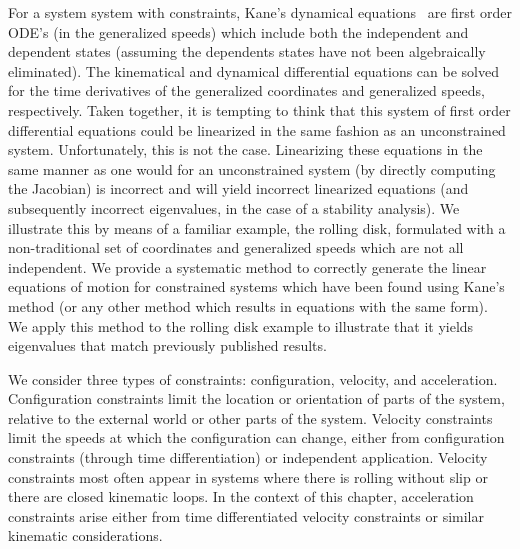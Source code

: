 For a system system with constraints, Kane's dynamical equations~\cite{Kane1985}
are first order ODE's (in the generalized speeds) which include both the
independent and dependent states (assuming the dependents states have not been
algebraically eliminated). The kinematical and dynamical differential equations
can be solved for the time derivatives of the generalized coordinates and
generalized speeds, respectively. Taken together, it is tempting to think that
this system of first order differential equations could be linearized in the
same fashion as an unconstrained system.  Unfortunately, this is not the case.
Linearizing these equations in the same manner as one would for an
unconstrained system (by directly computing the Jacobian) is incorrect and will
yield incorrect linearized equations (and subsequently incorrect eigenvalues,
in the case of a stability analysis). We illustrate this by means of a familiar
example, the rolling disk, formulated with a non-traditional set of coordinates
and generalized speeds which are not all independent. We provide a systematic
method to correctly generate the linear equations of motion for constrained
systems which have been found using Kane's method (or any other method which
results in equations with the same form). We apply this method to the rolling
disk example to illustrate that it yields eigenvalues that match previously
published results.

We consider three types of constraints: configuration, velocity, and
acceleration. Configuration constraints limit the location or orientation of
parts of the system, relative to the external world or other parts of the
system. Velocity constraints limit the speeds at which the configuration can
change, either from configuration constraints (through time differentiation) or
independent application. Velocity constraints most often appear in systems
where there is rolling without slip or there are closed kinematic loops. In the
context of this chapter, acceleration constraints arise either from time
differentiated velocity constraints or similar kinematic considerations.


